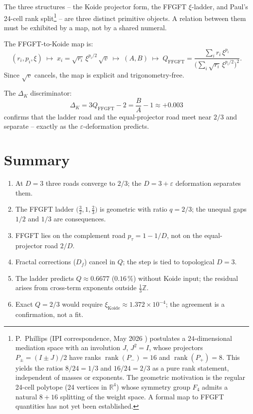 The three structures -- the Koide projector form, the FFGFT \(\xi\)-ladder,
and Paul's 24-cell rank split\footnote{%
P.~Phillips (IPI correspondence, May 2026 \cite{Phillips2026}) postulates a
\(24\)-dimensional mediation space with an involution \(J\),
\(J^2 = I\), whose projectors \(P_\pm = (I \pm J)/2\) have ranks
\(\operatorname{rank}(P_-) = 16\) and \(\operatorname{rank}(P_+) = 8\).
This yields the ratios \(8/24 = 1/3\) and \(16/24 = 2/3\)
as a pure rank statement, independent of masses or exponents.
The geometric motivation is the regular 24-cell polytope (24 vertices
in \(\mathbb{R}^4\)) whose symmetry group \(F_4\) admits a natural
\(8+16\) splitting of the weight space.
A formal map to FFGFT quantities has not yet been established.} --
are three distinct primitive objects.
A relation between them must be exhibited by a map, not by a shared numeral.

The FFGFT-to-Koide map is:
\begin{equation}
  (r_i, p_i, \xi)
  \;\longmapsto\;
  x_i = \sqrt{r_i}\,\xi^{p_i/2}\,\sqrt{v}
  \;\longmapsto\;
  (A, B)
  \;\longmapsto\;
  Q_{\text{FFGFT}} = \frac{\sum_i r_i\,\xi^{p_i}}
  {\bigl(\sum_i \sqrt{r_i}\,\xi^{p_i/2}\bigr)^2}.
\end{equation}
Since \(\sqrt{v}\) cancels, the map is explicit and trigonometry-free.

The \(\Delta_K\) discriminator:
\begin{equation}
  \Delta_K = 3Q_{\text{FFGFT}} - 2 = \frac{B}{A} - 1 \approx +0.003
\end{equation}
confirms that the ladder road and the equal-projector road meet near \(2/3\)
and separate -- exactly as the \(\varepsilon\)-deformation predicts.

\section{Summary}

\begin{enumerate}
  \item At \(D = 3\) three roads converge to \(2/3\);
        the \(D = 3+\varepsilon\) deformation separates them.
  \item The FFGFT ladder
        \(\bigl(\tfrac{3}{2}, 1, \tfrac{2}{3}\bigr)\)
        is geometric with ratio \(q = 2/3\);
        the unequal gaps \(1/2\) and \(1/3\) are consequences.
  \item FFGFT lies on the complement road
        \(p_\tau = 1 - 1/D\), not on the equal-projector road \(2/D\).
  \item Fractal corrections (\(D_f\)) cancel in \(Q\);
        the step is tied to topological \(D = 3\).
  \item The ladder predicts \(Q \approx 0.6677\)
        (\(0.16\,\%\)) without Koide input;
        the residual arises from cross-term exponents outside
        \(\tfrac{1}{3}\mathbb{Z}\).
  \item Exact \(Q = 2/3\) would require
        \(\xi_{\text{Koide}} \approx 1.372\times10^{-4}\);
        the agreement is a confirmation, not a fit.
\end{enumerate}

